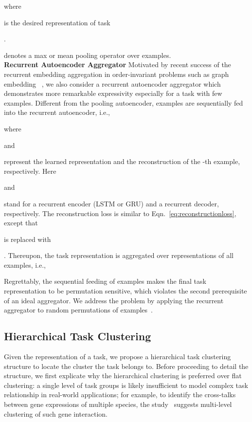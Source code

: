 \documentclass{article}
\begin{document}
where \begin{small}\end{small} is the desired representation of task \begin{small}\end{small}. \begin{small}\end{small} denotes a max or mean pooling operator over examples. 
\\
\textbf{Recurrent Autoencoder Aggregator}
Motivated by recent success of the recurrent embedding aggregation in order-invariant problems such as graph embedding ~\cite{hamilton2017inductive}, we also consider a recurrent autoencoder aggregator which demonstrates more remarkable expressivity especially for a task with few examples.
Different from the pooling autoencoder, examples are sequentially fed into the recurrent autoencoder, i.e.,

where \begin{small}

\end{small}
and \begin{small}

\end{small}
represent the learned representation  and the reconstruction of the -th example, respectively.
Here
\begin{small}

\end{small}
and \begin{small}

\end{small}
stand for a recurrent encoder (LSTM or GRU) and a recurrent decoder, respectively.
The reconstruction loss is similar to Eqn.~\eqref{eq:reconstructionloss}, except that \begin{small}\end{small} is replaced with \begin{small}\end{small}.
Thereupon, the task representation is aggregated over representations of all examples, i.e.,

Regrettably, the sequential feeding of examples makes the final task representation to be permutation sensitive, which violates the second prerequisite of an ideal aggregator. 
We address the problem by 
applying the recurrent aggregator to random permutations of examples~\cite{hamilton2017inductive}. 
\subsection{Hierarchical Task Clustering}
\label{sec:relationstructure}
Given the representation of a task, we propose a hierarchical task clustering structure to locate the cluster the task belongs to.
Before proceeding to detail the structure, we first explicate why the hierarchical clustering is preferred over flat clustering: a single level of task groups is likely insufficient to model complex task relationship in real-world applications; 
for example, to identify the cross-talks between gene expressions of multiple species, the study~\cite{kim2010tree} suggests multi-level clustering of such gene interaction.
\end{document}
